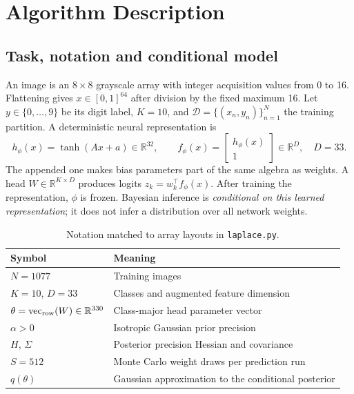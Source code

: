\documentclass[10pt,a4paper]{article}
\newcommand{\R}{\mathbb{R}}
\begin{document}
\section{Algorithm Description}
\subsection{Task, notation and conditional model}
An image is an $8\times8$ grayscale array with integer acquisition values from
0 to 16. Flattening gives $x\in[0,1]^{64}$ after division by the fixed maximum
16. Let $y\in\{0,\ldots,9\}$ be its digit label, $K=10$, and
$\mathcal D=\{(x_n,y_n)\}_{n=1}^{N}$ the training partition.
A deterministic neural representation is
\begin{equation}
h_\phi(x)=\tanh(Ax+a)\in\R^{32},\qquad
f_\phi(x)=\begin{bmatrix}h_\phi(x)\\1\end{bmatrix}\in\R^{D},\quad D=33.
\end{equation}
The appended one makes bias parameters part of the same algebra as weights.
A head $W\in\R^{K\times D}$ produces logits $z_k=w_k^\top f_\phi(x)$.
After training the representation, $\phi$ is frozen. Bayesian inference is
\emph{conditional on this learned representation}; it does not infer a
distribution over all network weights.

\begin{table}[H]\centering
\begin{tabular}{ll}\toprule Symbol & Meaning\\\midrule
$N=1077$ & Training images\\
$K=10$, $D=33$ & Classes and augmented feature dimension\\
$\theta=\operatorname{vec}_{\rm row}(W)\in\R^{330}$ & Class-major head parameter vector\\
$\alpha>0$ & Isotropic Gaussian prior precision\\
$H$, $\Sigma$ & Posterior precision Hessian and covariance\\
$S=512$ & Monte Carlo weight draws per prediction run\\
$q(\theta)$ & Gaussian approximation to the conditional posterior\\
\bottomrule\end{tabular}
\caption{Notation matched to array layouts in \texttt{laplace.py}.}
\end{table}
\end{document}
